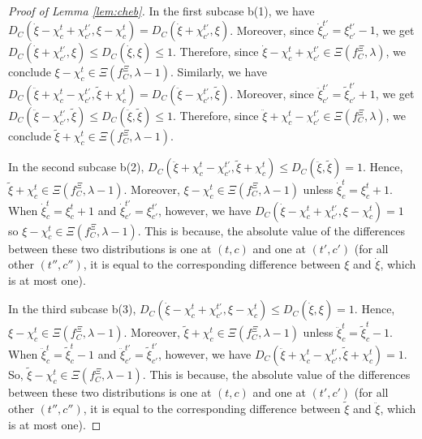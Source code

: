 \documentclass[12pt]{amsart}
\theoremstyle{remark}
\newcommand{\ieh}[1]{{\color{orange} IEH: #1 }}
\newcommand{\fk}[1]{{\color{red} FK: #1 }}
\begin{document}
\begin{proof}[Proof of Lemma \ref{lem:cheb}]
In the first subcase b(1), we have $D_C(\dot{\xi}-\chi_c^t+\chi_{c'}^{t'}, \xi-\chi_c^t) = D_C(\dot{\xi}+\chi_{c'}^{t'}, \xi)$. Moreover, since $\dot{\xi}_{c'}^{t'} = \xi_{c'}^{t'}-1$, we get $D_C(\dot{\xi}+\chi_{c'}^{t'}, \xi) \le D_C(\dot{\xi}, \xi) \le 1$. Therefore, since $\dot{\xi}-\chi_c^t+\chi_{c'}^{t'} \in \Xi(f_C^{\Xi},\lambda)$, we conclude $\xi-\chi_c^t \in \Xi(f_C^{\Xi},\lambda-1)$.
Similarly, we have $D_C(\ddot{\xi}+\chi_c^t-\chi_{c'}^{t'}, \tilde{\xi}+\chi_c^t) =D_C(\ddot{\xi}-\chi_{c'}^{t'}, \tilde{\xi})$. Moreover, since $\ddot{\xi}_{c'}^{t'} = \tilde{\xi}_{c'}^{t'}+1$, we get $D_C(\ddot{\xi}-\chi_{c'}^{t'}, \tilde{\xi}) \le D_C(\ddot{\xi},\tilde{\xi}) \le 1$. Therefore, since $\ddot{\xi}+\chi_c^t-\chi_{c'}^{t'}\in \Xi(f_C^{\Xi},\lambda)$, we conclude $\tilde{\xi}+\chi_c^t \in \Xi(f_C^{\Xi},\lambda-1)$.


In the second subcase b(2), $D_C(\ddot{\xi}+\chi_c^t-\chi_{c'}^{t'},\tilde{\xi}+\chi_c^t) \leq D_C(\ddot{\xi},\tilde{\xi}) = 1$. Hence, $\tilde{\xi}+\chi_c^t \in \Xi(f_C^{\Xi},\lambda-1)$. Moreover, $\xi-\chi_c^t \in \Xi(f_C^{\Xi},\lambda-1)$ unless $\dot{\xi}_c^t=\xi_c^t+1$. When $\dot{\xi}_c^t=\xi_c^t+1$ and $\dot{\xi}_{c'}^{t'} = \xi_{c'}^{t'}$, however, we have $D_C(\dot{\xi}-\chi_c^t+\chi_{c'}^{t'}, \xi-\chi_c^t) = 1$\, so $\xi-\chi_c^t \in \Xi(f_C^{\Xi},\lambda-1)$. This is because, the absolute value of the differences between these
two distributions is one at $(t,c)$ and one at $(t',c')$ (for all other $(t'',c'')$, it is equal to the corresponding difference between $\xi$ and $\dot{\xi}$, which is at most one).

In the third subcase b(3), $D_C(\dot{\xi}-\chi_c^t+\chi_{c'}^{t'}, \xi-\chi_c^t) \leq D_C(\dot{\xi}, \xi) = 1$. Hence, $\xi-\chi_c^t \in \Xi(f_C^{\Xi},\lambda-1)$.
Moreover, $\tilde{\xi}+\chi_c^t \in \Xi(f_C^{\Xi},\lambda-1)$ unless $\ddot{\xi}_c^t=\tilde \xi_c^t-1$. When $\ddot{\xi}_c^t=\tilde \xi_c^t-1$ and $\ddot{\xi}_{c'}^{t'} = \tilde{\xi}_{c'}^{t'}$, however, we have $D_C(\ddot{\xi}+\chi_c^t-\chi_{c'}^{t'},\tilde{\xi}+\chi_c^t) = 1$. So, $\tilde \xi - \chi_c^t \in \Xi(f_C^{\Xi},\lambda-1)$. This is because, the absolute value of the differences between these two distributions is one at
$(t,c)$ and one at $(t',c')$ (for all other $(t'',c'')$, it is equal to the corresponding difference between $\tilde{\xi}$ and $\ddot{\xi}$, which is at most one).


\end{proof}
\end{document}
